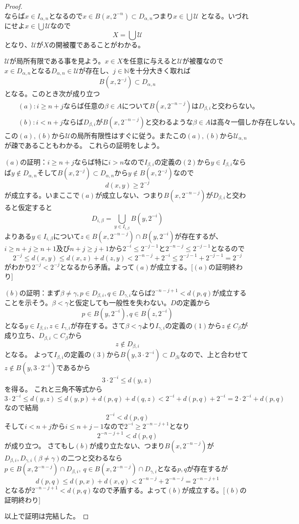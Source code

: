 \documentclass[leqno]{jsarticle}
\newcommand{\nn}{\mathbb{N}}
\newcommand{\al}{\alpha}
\newcommand{\be}{\beta}
\newcommand{\ga}{\gamma}
\begin{document}
\begin{proof}
\[\]
ならば$x\in I_{\al,n}$となるので$x\in B(x,2^{-n})\subset D_{\al,n}$つまり$x\in \bigcup\mathcal{U}$
となる。いづれにせよ$x\in \bigcup\mathcal{U}$なので
\[
X=\bigcup\mathcal{U}
\]
となり、$\mathcal{U}$が$X$の開被覆であることがわかる。\par
$\mathcal{U}$が局所有限である事を見よう。$x\in X$を任意に与えると$\mathcal{U}$が被覆なので
$x\in D_{\al,n}$となる$D_{\al,n}\in \mathcal{U}$が存在し、$j\in \nn$を十分大きく取れば
\[
B(x,2^{-j})\subset D_{\al,n}
\]
となる。このとき次が成り立つ
\begin{eqnarray*}
&&(a):i\ge n+jならば任意の\be \in AについてB(x,2^{-n-j})はD_{\be,i}と交わらない。\\
&&(b):i<n+jならばD_{\be,i}がB(x,2^{-n-j})と交わるような\be\in A は高々一個しか存在しない。
\end{eqnarray*}
この$(a),(b)$から$\mathcal{U}$の局所有限性はすぐに従う。またこの$(a),(b)$から$\mathcal{U}_{\al,n}$が疎であることもわかる。
これらの証明をしよう。\par
$(a)$の証明：$i\ge n+j$ならば特に$i>n$なので$I_{\be,i}$の定義の$(2)$から$y\in I_{\be,i}$ならば$y\not\in D_{\al,n}$そして$B(x,2^{-j})\subset D_{\al,n}$から$y\not\in B(x,2^{-j})$なので
\[
d(x,y)\ge 2^{-j}
\]
が成立する。いまここで$(a)$が成立しない、つまり$B(x,2^{-n-j})$が$D_{\be,i}$と交わると仮定すると
\[
D_{i,\be }=\bigcup_{y\in I_{i,\be}}B(y,2^{-i})
\]
よりある$y\in I_{i,\be}$について$z\in B(x,2^{-n-j})\cap B(y,2^{-i})$が存在するが、$i\ge n+j\ge n+1$及び$n+j\ge j+1$から$2^{-i}\le 2^{-j-1}$と$2^{-n-j}\le 2^{-j-1}$となるので
\[
2^{-j}\le d(x,y)\le d(x,z)+d(z,y)<2^{-n-j}+2^{-i}\le 2^{-j-1}+2^{-j-1}=2^{-j}
\]
がわかり$2^{-j}<2^{-j}$となるから矛盾。よって$(a)$が成立する。[$(a)$の証明終わり]\par
$(b)$の証明：まず$\be\neq\ga,p\in D_{\be,i},q\in D_{\ga,i}$ならば$2^{-n-j+1}<d(p,q)$が成立することを示そう。$\be<\ga$と仮定しても一般性を失わない。$D$の定義から
\[
p\in B(y,2^{-i}),q\in B(z,2^{-i})
\]
となる$y\in I_{\be,i},z\in I_{\ga,i}$が存在する。さて$\be<\ga$より$I_{\ga,i}$の定義の$(1)$から$z\not\in C_{\be }$が成り立ち、$D_{\be,i}\subset C_{\be}$から
\[
z\not\in D_{\be,i}
\]
となる。
よって$I_{\be,i}$の定義の$(3)$から$B(y,3\cdot 2^{-i})\subset D_{\be i}$なので、上と合わせて$z\not\in B(y,3\cdot 2^{-i})$であるから
\[
3\cdot 2^{-i}\le d(y,z)
\]
を得る。
これと三角不等式から
\[
3\cdot 2^{-i}\le d(y,z)\le d(y,p)+d(p,q)+d(q,z)<2^{-i}+d(p,q)+2^{-i}=2\cdot 2^{-i}+d(p,q)
\]
なので結局
\[
2^{-i}<d(p,q)
\]
そして$i<n+j$から$i\le n+j-1$なので$2^{-i}\ge 2^{-n-j+1}$となり
\[
2^{-n-j+1}<d(p,q)
\]が成り立つ。
さてもし$(b)$が成り立たない、つまり$B(x,2^{-n-j})$が$D_{\be,i},D_{\ga,i}(\be\neq \ga)$の二つと交わるなら\\$p\in B(x,2^{-n-j})\cap D_{\be,i},\ q\in B(x,2^{-n-j})\cap D_{\ga,i}$となる$p,q$が存在するが
\[
d(p,q)\le d(p,x)+d(x,q)<2^{-n-j}+2^{-n-j}=2^{-n-j+1}
\]
となるが$2^{-n-j+1}<d(p,q)$なので矛盾する。よって$(b)$が成立する。[$(b)$の証明終わり]\par
以上で証明は完結した。
\end{proof}
\end{document}
